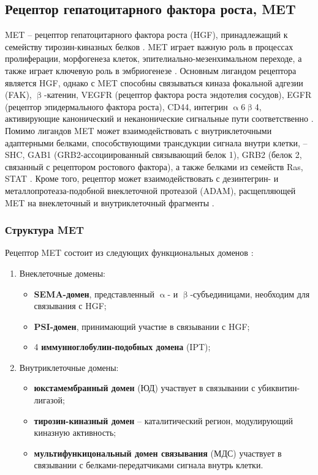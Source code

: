 \subsection{Рецептор гепатоцитарного фактора роста, MET}

MET – рецептор гепатоцитарного фактора роста (HGF), принадлежащий к семейству тирозин-киназных белков \cite{park_sequence_1987}. MET играет важную роль в процессах пролиферации, морфогенеза клеток, эпителиально-мезенхимальном переходе, а также играет ключевую роль в эмбриогенезе \cite{trusolino_met_2010}.  Основным лигандом рецептора является HGF, однако с MET способны связываться киназа фокальной адгезии (FAK), $\upbeta$-катенин, VEGFR (рецептор фактора роста эндотелия сосудов), EGFR (рецептор эпидермального фактора роста), CD44, интегрин $\upalpha$6$\upbeta$4, активирующие канонический и неканонические сигнальные пути соответственно \cite{garcia-vilas_updates_2018}. Помимо лигандов MET может взаимодействовать с внутриклеточными адаптерными белками, способствующими трансдукции сигнала внутри клетки, -- SHC, GAB1 (GRB2-ассоциированный связывающий белок 1), GRB2 (белок 2, связанный с рецептором ростового фактора), а также белками из  семейств Ras, STAT \cite{trusolino_met_2010}. Кроме того, рецептор может взаимодействовать с  дезинтегрин- и металлопротеаза-подобной внеклеточной протеазой (ADAM), расщепляющей MET на внеклеточный и внутриклеточный фрагменты \cite{foveau_down-regulation_2009}.

\subsubsection{Структура MET}

Рецептор MET  состоит из следующих функциональных доменов \cite{trusolino_met_2010}:
\begin{enumerate}
	\item Внеклеточные домены:
	\begin{itemize}
		\item \textbf{SEMA-домен}, представленный $\upalpha$- и $\upbeta$-субъединицами, необходим для связывания с HGF;
		\item \textbf{PSI-домен}, принимающий участие в связывании с HGF;
		\item 4 \textbf{иммунноглобулин-подобных домена} (IPT);
	\end{itemize} 
	\item Внутриклеточные домены:
	\begin{itemize}
		\item \textbf{юкстамембранный домен} (ЮД) участвует в связывании с убиквитин-лигазой;
		\item \textbf{тирозин-киназный домен} -- каталитический регион, модулирующий киназную активность;
		\item \textbf{мультифункицональный домен связывания} (МДС) участвует в связывании с белками-передатчиками сигнала внутрь клетки.
	\end{itemize} 
\end{enumerate}

